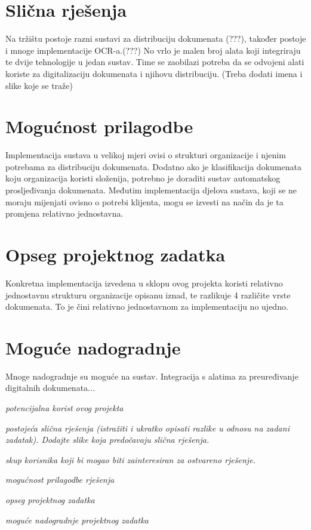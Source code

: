 	\section{Slična rješenja}
	
	Na tržištu postoje razni sustavi za distribuciju dokumenata (???), također postoje i mnoge implementacije OCR-a.(???) No vrlo je malen broj alata koji integriraju te dvije tehnologije u jedan sustav. Time se zaobilazi potreba da se odvojeni alati koriste za digitalizaciju dokumenata i njihovu distribuciju. (Treba dodati imena i slike koje se traže)\\
	
	\section{Mogućnost prilagodbe}
	
	Implementacija sustava u velikoj mjeri ovisi o strukturi organizacije i njenim potrebama za distribuciju dokumenata. Dodatno ako je klasifikacija dokumenata koju organizacija koristi složenija, potrebno je doraditi sustav automatskog prosljeđivanja dokumenata. Međutim implementacija djelova sustava, koji se ne moraju mijenjati ovisno o potrebi klijenta, mogu se izvesti na način da je ta promjena relativno jednostavna.
	
	\section{Opseg projektnog zadatka}
	
	Konkretna implementacija izvedena u sklopu ovog projekta koristi relativno jednostavnu strukturu organizacije opisanu iznad, te razlikuje 4 različite vrste dokumenata. To je čini relativno jednostavnom za implementaciju no ujedno.
	
	\section{Moguće nadogradnje}
	
	Mnoge nadogradnje su moguće na sustav. Integracija s alatima za preuređivanje digitalnih dokumenata...
	
	
		
		\begin{packed_item}
			\item \textit{potencijalna korist ovog projekta}
			\item \textit{postojeća slična rješenja (istražiti i ukratko opisati razlike u odnosu na zadani zadatak). Dodajte slike koja predočavaju slična rješenja.}
			\item \textit{skup korisnika koji bi mogao biti zainteresiran za ostvareno rješenje.}
			\item \textit{mogućnost prilagodbe rješenja }
			\item \textit{opseg projektnog zadatka}
			\item \textit{moguće nadogradnje projektnog zadatka}
		\end{packed_item}
		
